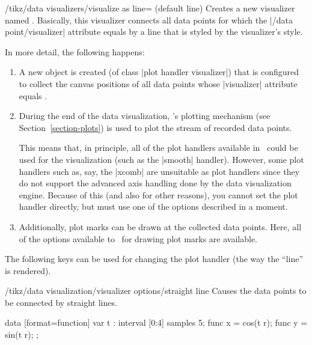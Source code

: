 \begin{key}{/tikz/data visualizers/visualize as line= (default line)}
  Creates a new visualizer named . Basically, 
  this visualizer connects all data points for which the
  |/data point/visualizer| attribute equals  by
  a line that is styled by the visualizer's style.

  In more detail, the following happens:
  \begin{enumerate}
  \item A new object is created (of class |plot handler visualizer|)
    that is configured to collect the canvas positions of all data
    points whose |visualizer| attribute equals .
  \item During the end of the data visualization, \pgfname's plotting
    mechanism (see Section~\ref{section-plots}) is used to plot the
    stream of recorded data points.

    This means that, in principle, all of the plot handlers available
    in \tikzname\ could be used for the visualization (such as the
    |smooth| handler). However, some plot handlers such as, say, the
    |xcomb| are unsuitable as plot handlers since they do not support
    the advanced axis handling done by the data visualization
    engine. Because of this (and also for other reasons), you cannot
    set the plot handler directly, but must use one of the options
    described in a moment. 
  \item Additionally, plot marks can be drawn at the collected data
    points. Here, all of the options available to \tikzname\ for
    drawing plot marks are available.
  \end{enumerate}
  
  The following keys can be used for changing the plot handler (the
  way the ``line'' is rendered).
  
  \begin{key}{/tikz/data visualization/visualizer options/straight line}
    Causes the data points to be connected by straight lines.
\begin{codeexample}[]
\tikz [scale=.55] \datavisualization
 [scientific clean axes, all axes={ticks=few},
  visualize as smooth line=my data,  my data={straight line}]
data [format=function] {
  var t : interval [0:4] samples 5;
  func x = cos(\value t r);
  func y = sin(\value t r);
};
\end{codeexample}
  \end{key}


\end{key}
